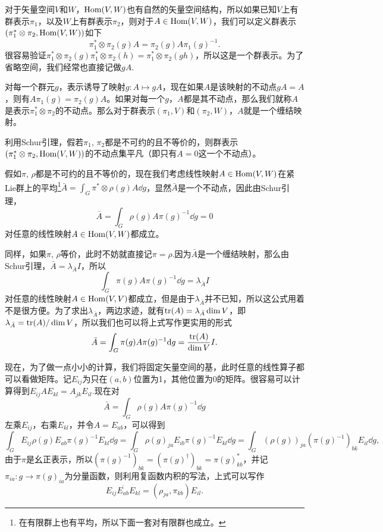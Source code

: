 \para 对于矢量空间$V$和$W$，$\operatorname{Hom}(V,W)$也有自然的矢量空间结构，所以如果已知$V$上有群表示$\pi_1$，以及$W$上有群表示$\pi_2$，则对于$A\in \operatorname{Hom}(V,W)$，我们可以定义群表示$(\pi_1^*\otimes\pi_2,\operatorname{Hom}(V,W))$如下
\[
	\pi_1^*\otimes\pi_2(g)A=\pi_2(g)A\pi_1(g)^{-1}.
\]
很容易验证$\pi_1^*\otimes\pi_2(g)\pi_1^*\otimes\pi_2(h)=\pi_1^*\otimes\pi_2(gh)$，所以这是一个群表示。为了省略空间，我们经常也直接记做$gA$.

对每一个群元$g$，表示诱导了映射$g:A\mapsto gA$，现在如果$A$是该映射的不动点$gA=A$，则有$A\pi_1(g)=\pi_2(g)A$。如果对每一个$g$，$A$都是其不动点，那么我们就称$A$是表示$\pi_1^*\otimes\pi_2$的不动点。那么对于群表示$(\pi_1,V)$和$(\pi_2,W)$，$A$就是一个缠结映射。

\para 利用Schur引理，假若$\pi_1$, $\pi_2$都是不可约的且不等价的，则群表示$(\pi_1^*\otimes\pi_2,\operatorname{Hom}(V,W))$的不动点集平凡（即只有$A=0$这一个不动点）。

假如$\pi$, $\rho$都是不可约的且不等价的，现在我们考虑线性映射$A\in \operatorname{Hom}(V,W)$在紧Lie群上的平均\footnote{在有限群上也有平均，所以下面一套对有限群也成立。}$\bar{A}=\int_G \pi^*\otimes\rho(g)A \dd g$，显然$\bar{A}$是一个不动点，因此由Schur引理，
\[
	\bar{A}=\int_G \rho(g)A\pi(g)^{-1}\dd g=0
\]
对任意的线性映射$A\in \operatorname{Hom}(V,W)$都成立。

同样，如果$\pi$, $\rho$等价，此时不妨就直接记$\pi=\rho$.因为$\bar{A}$是一个缠结映射，那么由Schur引理，$\bar{A}=\lambda_{\bar{A}} I$，所以
\[
	\int_G \pi(g)A\pi(g)^{-1}\dd g=\lambda_{\bar{A}} I
\]
对任意的线性映射$A\in \operatorname{Hom}(V,V)$都成立，但是由于$\lambda_{\bar{A}}$并不已知，所以这公式用着不是很方便。为了求出$\lambda_{\bar{A}}$，两边求迹，就有$\operatorname{tr}(A)=\lambda_{\bar{A}} \dim V$，即$\lambda_{\bar{A}}=\operatorname{tr}(A)/\dim V$，所以我们也可以将上式写作更实用的形式
\[
	\bar{A}=\int_G \pi(g)A\pi(g)^{-1}\mathrm{d} g=\frac{\operatorname{tr}(A)}{\dim V}I.
\]

\para 现在，为了做一点小小的计算，我们将固定矢量空间的基，此时任意的线性算子都可以看做矩阵。记$E_{ij}$为只在$(a,b)$位置为1，其他位置为0的矩阵。很容易可以计算得到$E_{ij}AE_{kl}=A_{jk}E_{il}$.现在对
\[
	\bar{A}=\int_G \rho(g)A\pi(g)^{-1}\dd g
\]
左乘$E_{ij}$，右乘$E_{kl}$，并令$A=E_{ab}$，可以得到
\[
	\int_G E_{ij}\rho(g)E_{ab}\pi(g)^{-1}E_{kl}\dd g=\int_G \rho(g)_{ja}E_{ib}\pi(g)^{-1}E_{kl}\dd g=\int_G (\rho(g))_{ja}\left(\pi(g)^{-1}\right)_{bk}E_{il}\dd g,
\]
由于$\pi$是幺正表示，所以$\left(\pi(g)^{-1}\right)_{bk}=\left(\pi(g)^{\dag}\right)_{bk}=\pi(g)_{kb}^*$，并记$\pi_{ia}:g\to \pi(g)_{ia}$为分量函数，则利用复函数内积的写法，上式可以写作
\[
	E_{ij}\overline{E_{ab}}E_{kl}=\left(\rho_{ja},\pi_{kb}\right)E_{il}.
\]

